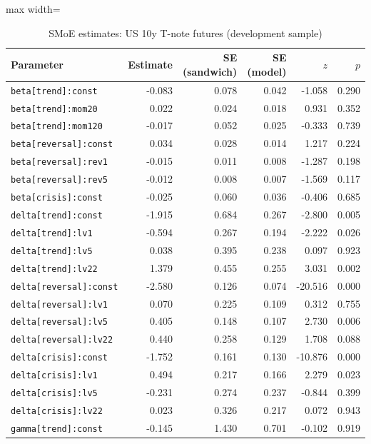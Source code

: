 \begin{table}[!htbp]\centering\scriptsize
\caption{SMoE estimates: US 10y T-note futures (development sample)}\label{tab:params_zn_fut}
\begin{adjustbox}{max width=\textwidth}
\begin{tabular}{lrrrrr}
\toprule
Parameter & Estimate & SE (sandwich) & SE (model) & $z$ & $p$\\
\midrule
\texttt{beta[trend]:const} & -0.083 & 0.078 & 0.042 & -1.058 & 0.290\\
\texttt{beta[trend]:mom20} & 0.022 & 0.024 & 0.018 & 0.931 & 0.352\\
\texttt{beta[trend]:mom120} & -0.017 & 0.052 & 0.025 & -0.333 & 0.739\\
\texttt{beta[reversal]:const} & 0.034 & 0.028 & 0.014 & 1.217 & 0.224\\
\texttt{beta[reversal]:rev1} & -0.015 & 0.011 & 0.008 & -1.287 & 0.198\\
\texttt{beta[reversal]:rev5} & -0.012 & 0.008 & 0.007 & -1.569 & 0.117\\
\texttt{beta[crisis]:const} & -0.025 & 0.060 & 0.036 & -0.406 & 0.685\\
\texttt{delta[trend]:const} & -1.915 & 0.684 & 0.267 & -2.800 & 0.005\\
\texttt{delta[trend]:lv1} & -0.594 & 0.267 & 0.194 & -2.222 & 0.026\\
\texttt{delta[trend]:lv5} & 0.038 & 0.395 & 0.238 & 0.097 & 0.923\\
\texttt{delta[trend]:lv22} & 1.379 & 0.455 & 0.255 & 3.031 & 0.002\\
\texttt{delta[reversal]:const} & -2.580 & 0.126 & 0.074 & -20.516 & 0.000\\
\texttt{delta[reversal]:lv1} & 0.070 & 0.225 & 0.109 & 0.312 & 0.755\\
\texttt{delta[reversal]:lv5} & 0.405 & 0.148 & 0.107 & 2.730 & 0.006\\
\texttt{delta[reversal]:lv22} & 0.440 & 0.258 & 0.129 & 1.708 & 0.088\\
\texttt{delta[crisis]:const} & -1.752 & 0.161 & 0.130 & -10.876 & 0.000\\
\texttt{delta[crisis]:lv1} & 0.494 & 0.217 & 0.166 & 2.279 & 0.023\\
\texttt{delta[crisis]:lv5} & -0.231 & 0.274 & 0.237 & -0.844 & 0.399\\
\texttt{delta[crisis]:lv22} & 0.023 & 0.326 & 0.217 & 0.072 & 0.943\\
\texttt{gamma[trend]:const} & -0.145 & 1.430 & 0.701 & -0.102 & 0.919\\

\end{tabular}
\end{adjustbox}
\end{table}
